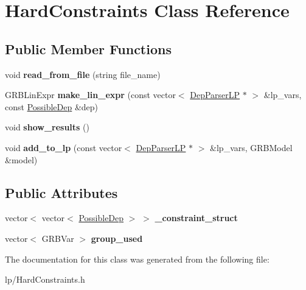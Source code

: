\hypertarget{class_hard_constraints}{
\section{HardConstraints Class Reference}
\label{class_hard_constraints}
}
\subsection*{Public Member Functions}
\begin{DoxyCompactItemize}
\item 
\hypertarget{class_hard_constraints_ad457a78e966e6ce3d71bfb3401b0300b}{
void {\bfseries read\_\-from\_\-file} (string file\_\-name)}
\label{class_hard_constraints_ad457a78e966e6ce3d71bfb3401b0300b}

\item 
\hypertarget{class_hard_constraints_a923f4ddd8b164d924147c22f054a9c7e}{
GRBLinExpr {\bfseries make\_\-lin\_\-expr} (const vector$<$ \hyperlink{struct_scarab_1_1_h_g_1_1_dep_parser_l_p}{DepParserLP} $\ast$ $>$ \&lp\_\-vars, const \hyperlink{struct_possible_dep}{PossibleDep} \&dep)}
\label{class_hard_constraints_a923f4ddd8b164d924147c22f054a9c7e}

\item 
\hypertarget{class_hard_constraints_a0945fb67209be1cc95b31522d96e51cc}{
void {\bfseries show\_\-results} ()}
\label{class_hard_constraints_a0945fb67209be1cc95b31522d96e51cc}

\item 
\hypertarget{class_hard_constraints_a71ae98e67f5e5d3035aff1c2ef941a92}{
void {\bfseries add\_\-to\_\-lp} (const vector$<$ \hyperlink{struct_scarab_1_1_h_g_1_1_dep_parser_l_p}{DepParserLP} $\ast$ $>$ \&lp\_\-vars, GRBModel \&model)}
\label{class_hard_constraints_a71ae98e67f5e5d3035aff1c2ef941a92}

\end{DoxyCompactItemize}
\subsection*{Public Attributes}
\begin{DoxyCompactItemize}
\item 
\hypertarget{class_hard_constraints_ae0305e95d8065eb186ccae220b8e16f4}{
vector$<$ vector$<$ \hyperlink{struct_possible_dep}{PossibleDep} $>$ $>$ {\bfseries \_\-constraint\_\-struct}}
\label{class_hard_constraints_ae0305e95d8065eb186ccae220b8e16f4}

\item 
\hypertarget{class_hard_constraints_a6b370ae5376bf283115092ab4bd33743}{
vector$<$ GRBVar $>$ {\bfseries group\_\-used}}
\label{class_hard_constraints_a6b370ae5376bf283115092ab4bd33743}

\end{DoxyCompactItemize}


The documentation for this class was generated from the following file:\begin{DoxyCompactItemize}
\item 
lp/HardConstraints.h\end{DoxyCompactItemize}
